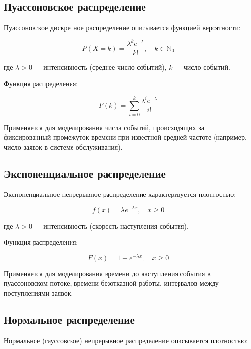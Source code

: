 \subsection{Пуассоновское распределение}

Пуассоновское дискретное распределение описывается функцией вероятности:

\begin{equation}
P(X=k) = \frac{\lambda^k e^{-\lambda}}{k!}, \quad k \in \mathbb{N}_0
\end{equation}

где $\lambda > 0$ --- интенсивность (среднее число событий), $k$ --- число событий.

Функция распределения:

\begin{equation}
F(k) = \sum_{i=0}^{k} \frac{\lambda^i e^{-\lambda}}{i!}
\end{equation}

Применяется для моделирования числа событий, происходящих за фиксированный промежуток времени при известной средней частоте (например, число заявок в системе обслуживания).

\subsection{Экспоненциальное распределение}

Экспоненциальное непрерывное распределение характеризуется плотностью:

\begin{equation}
f(x) = \lambda e^{-\lambda x}, \quad x \geq 0
\end{equation}

где $\lambda > 0$ --- интенсивность (скорость наступления события).

Функция распределения:

\begin{equation}
F(x) = 1 - e^{-\lambda x}, \quad x \geq 0
\end{equation}

Применяется для моделирования времени до наступления события в пуассоновском потоке, времени безотказной работы, интервалов между поступлениями заявок.

\subsection{Нормальное распределение}

Нормальное (гауссовское) непрерывное распределение описывается плотностью:

